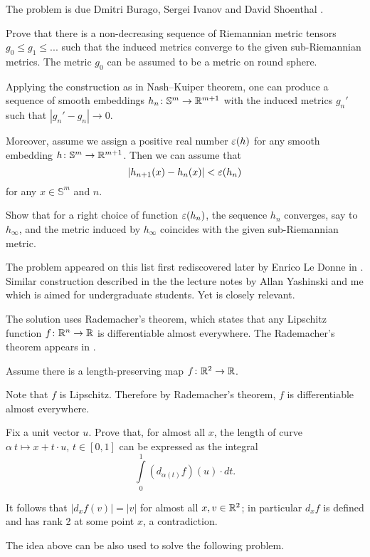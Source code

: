 The problem is due
Dmitri Burago, 
Sergei Ivanov 
and David Shoenthal \cite[see][]{BIS}.

Prove that there is a non-decreasing sequence of Riemannian metric tensors
$g_0\le g_1\le ...$ such that the induced metrics converge to the given sub-Riemannian metrics.
The metric $g_0$ can be assumed to be a metric on round sphere.

Applying the construction as in Nash--Kuiper theorem,
one can produce a sequence of smooth embeddings $h_n\colon\mathbb{S}^m\to \mathbb{R}^{m+1}$ with the induced metrics $g_n'$
such that $|g_n'-g_n|\to 0$.

Moreover, assume we assign a positive real number $\varepsilon(h)$ for any smooth embedding $h\colon\mathbb{S}^m\to\mathbb{R}^{m+1}$.
Then we can assume that 
\[|h_{n+1}(x)-h_n(x)|<\varepsilon(h_n)\] for any $x\in \mathbb{S}^m$ and $n$.

Show that for a right choice of function $\varepsilon(h_n)$,
the sequence $h_n$ converges, say to $h_\infty$, 
and the metric induced by $h_\infty$ coincides with the given sub-Riemannian metric.\qeds


The problem appeared 
on this list first rediscovered later by Enrico Le Donne in \cite{le-donne}.
Similar construction described in the the lecture notes by Allan Yashinski and me \cite[see][]{petrunin-yashinsky} 
which is aimed for undergraduate students. 
Yet \cite{petrunin-paths} is closely relevant.

The solution uses Rademacher's theorem,
which states that any Lipschitz function $f\colon\mathbb{R}^n\to\mathbb{R}$ 
is differentiable almost everywhere.
The Rademacher's theorem appears in \cite{rademacher}. \qeds


Assume there is a length-preserving map $f\colon\mathbb{R}^2\to \mathbb{R}$.

Note that $f$ is Lipschitz.
Therefore by Rademacher's theorem, $f$ is differentiable almost everywhere.

Fix a unit vector $u$.
Prove that, for almost all $x$, the length of curve 
$\alpha\:t\mapsto x+t\cdot u$, $t\in[0,1]$ can be expressed as the integral
\[\int\limits_0^1 (d_{\alpha(t)}f)(u) \cdot dt.\]

It follows that $|d_xf(v)|=|v|$ for almost all $x,v\in\mathbb{R}^2$;
in particular $d_xf$ is defined and has rank 2 at some point $x$, a contradiction. \qeds 


The idea above can be also used to solve the following problem.


